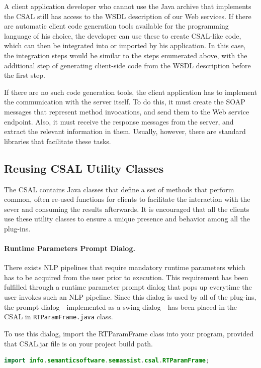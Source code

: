 A client application developer who cannot use the Java archive that
implements the CSAL still has access to the WSDL description of our
Web services. If there are automatic client code generation tools
available for the programming language of his choice, the developer
can use these to create CSAL-like code, which can then be integrated
into or imported by his application. In this case, the integration
steps would be similar to the steps enumerated above, with the
additional step of generating client-side code from the WSDL
description before the first step.

If there are no such code generation tools, the client application has
to implement the communication with the server itself. To do this, it
must create the SOAP messages that represent method invocations, and
send them to the Web service endpoint. Also, it must receive the
response messages from the server, and extract the relevant
information in them. Usually, however, there are standard libraries
that facilitate these tasks.

\subsection{Reusing CSAL Utility Classes}
The CSAL contains Java classes that define a set of methods that perform common, often re-used functions for clients to facilitate the interaction with the sever and consuming the results afterwards. It is encouraged that all the clients use these utility classes to ensure a unique presence and behavior among all the plug-ins.

\paragraph{Runtime Parameters Prompt Dialog.} There exists NLP pipelines that require mandatory runtime parameters which has to be acquired from the user prior to execution. This requirement has been fulfilled through a runtime parameter prompt dialog that pops up everytime the user invokes such an NLP pipeline. Since this dialog is used by all of the plug-ins, the prompt dialog - implemented as a swing dialog - has been placed in the CSAL in \texttt{RTParamFrame.java} class.

To use this dialog, import the RTParamFrame class into your program, provided that CSAL.jar file is on your project build path.

\begin{lstlisting}[language=Java,xleftmargin=4mm,columns=flexible]
import info.semanticsoftware.semassist.csal.RTParamFrame;
\end{lstlisting}

